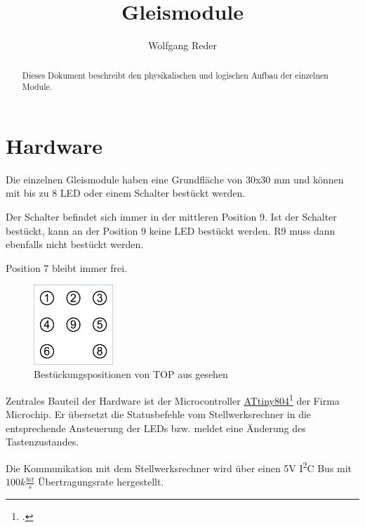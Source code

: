 \documentclass[10pt,a4paper]{article}
\author{Wolfgang Reder}
\title{Gleismodule}
\begin{document}
\maketitle
\begin{abstract}
Dieses Dokument beschreibt den physikalischen und logischen Aufbau der einzelnen Module.
\end{abstract}
\tableofcontents
\newpage
\listoffigures
\newpage
\listoftables
\newpage
\section{Hardware}
Die einzelnen Gleismodule haben eine Grundfläche von 30x30 mm und können mit bis zu 8 LED oder einem Schalter bestückt werden.

Der Schalter befindet sich immer in der mittleren Position 9. Ist der Schalter bestückt, kann an der Position 9 keine LED bestückt werden. R9 muss dann ebenfalls nicht bestückt werden.

Position 7 bleibt immer frei.
\begin{figure}[hbtp]
\centering
\includegraphics[width=3cm]{../folien/symbol.png}
\caption[Bestückungspositionen]{Bestückungspositionen von TOP aus gesehen}
\end{figure}

Zentrales Bauteil der Hardware ist der Microcontroller \href{https://www.microchip.com/wwwproducts/en/ATtiny804}{ATtiny804}\footcite{Microchip2019a} der Firma Microchip. Er übersetzt die Statusbefehle vom Stellwerksrechner in die entsprechende Ansteuerung der LEDs bzw. meldet eine Änderung des Tastenzustandes.

Die Kommunikation mit dem Stellwerksrechner wird über einen 5V I\textsuperscript{2}C Bus mit $100k\frac{bit}{s}$ Übertragungsrate hergestellt. 
\end{document}
